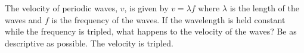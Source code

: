 {The velocity of periodic waves, $v$, is given by $v=\lambda f$ where $\lambda$ is the length of the waves and $f$ is the frequency of the waves. If the wavelength is held constant while the frequency is tripled, what happens to the velocity of the waves? Be as descriptive as possible.}
{The velocity is tripled.}
